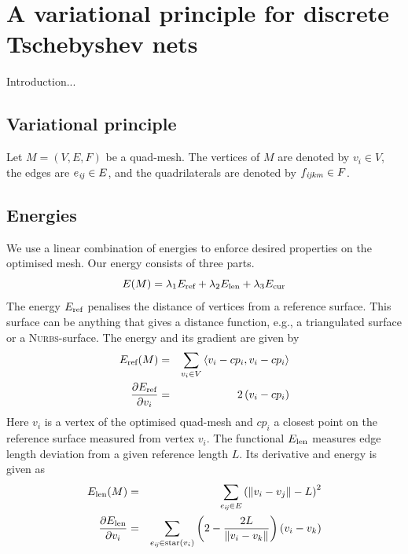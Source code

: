 
\chapter{A variational principle for discrete Tschebyshev nets}

Introduction...

\section{Variational principle}

Let $M=(V,E,F)$ be a quad-mesh. The vertices of $M$ are denoted by $v_i \in V$, the edges
are $e_{\mathrm{\it{ij}}} \in E$, and the quadrilaterals are denoted by $f_{\mathrm{\it{ijkm}}} \in F$.
\section{Energies}
We use a linear combination of energies to enforce desired properties on the optimised mesh.
Our energy consists of three parts.
\begin{equation}
	E(M) =	\lambda_1 E_{\textrm{\scriptsize{ref}}} + 
		\lambda_2 E_{\textrm{\scriptsize{len}}} +
		\lambda_3 E_{\textrm{\scriptsize{cur}}}
	\label{eq:energy_combination}
\end{equation}
The energy $E_{\textrm{\scriptsize{ref}}}$ penalises the distance of vertices from a
reference surface. This surface can be anything that gives a distance function, e.g., a
triangulated surface or a \textsc{Nurbs}-surface. The energy and its gradient are given 
by
\begin{eqnarray*}
	E_{\textrm{\scriptsize{ref}}}(M) &=& 
	\sum_{v_i \in V}\left<v_i - cp_i, v_i - cp_i\right> \\
	\frac{\partial E_\textrm{\scriptsize{ref}}}{\partial v_i} &=&
	2\left(v_i - cp_i\right)
	\label{eq:energy_reference}
\end{eqnarray*}
Here $v_i$ is a vertex of the optimised quad-mesh and $cp_i$ a closest point on the reference
surface measured from vertex $v_i$. The functional $E_{\textrm{\scriptsize{len}}}$ measures
edge length deviation from a given reference length $L$. Its derivative and energy is given as
\begin{eqnarray*}
	E_{\textrm{\scriptsize{len}}}(M) &=& 
	\sum_{e_{\mathrm{\it{ij}}} \in E} \left(\Vert v_i - v_j \Vert - L\right)^2\\
	\frac{\partial E_\textrm{\scriptsize{len}}}{\partial v_i} &=& 
	\sum_{e_{\mathrm{\it{ij}}} \in \textrm{\scriptsize{star}}(v_i)}
	\left(2 - \frac{2L}{\Vert v_i - v_k \Vert}\right)\left(v_i - v_k \right)
\end{eqnarray*}
